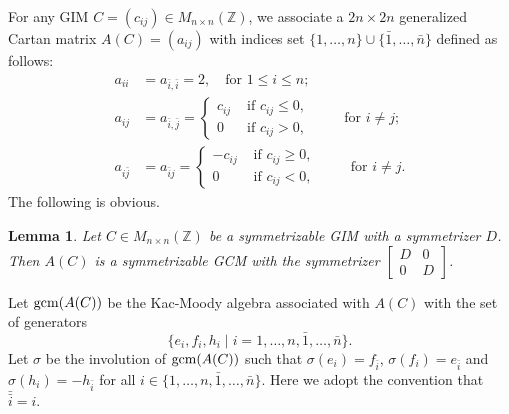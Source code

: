 \documentclass[12pt,reqno]{amsart}
\numberwithin{equation}{section}
\newtheorem{lemma}[theorem]{Lemma}
\begin{document}
	For any GIM ${C}=(c_{ij})\in M_{n\times n}(\mathbb{Z})$, we associate a $2n\times 2n$ generalized Cartan matrix $A(C)=(a_{ij})$ with indices set $\{1, \ldots, n\} \cup \{\bar{1}, \ldots, \bar{n}\}$ defined as follows:
	\begin{align}
		a_{ii}&=a_{\bar{i},\bar{i}}=2, \quad \text{for $1\leq i\leq n$}; \label{construction-GIM-GCM1}\\
		a_{ij}&=a_{\bar i,\bar j}=\begin{cases}
			c_{ij} & \text{ if } c_{ij}\le 0,\\
			0 & \text{ if } c_{ij}>0,
		\end{cases}
		\qquad \text{ for $i\neq j$};\label{construction-GIM-GCM2}\\
		a_{i\bar j}&=a_{\bar i j}=\begin{cases}
			-c_{ij} & \text{ if } c_{ij}\ge 0, \\
			0 &\text{ if }c_{ij}<0,
		\end{cases} \qquad\text{ for $i\neq j$}.\label{construction-GIM-GCM3}
	\end{align}
	The following is obvious.
	\begin{lemma}
		Let $C\in M_{n\times n}(\mathbb{Z})$ be a symmetrizable GIM with a symmetrizer $D$. Then $A(C)$ is a symmetrizable GCM with the symmetrizer $\begin{bmatrix}D&0\\ 0&D\end{bmatrix}$.
	\end{lemma}
	Let ${\rm gcm}(A(C))$ be the Kac-Moody algebra associated with $A(C)$ with the set of generators \[\{e_i,f_i,h_i\mid i=1, \ldots, n ,\bar{1}, \ldots, \bar{n}\}.\] 
	Let $\sigma$ be the involution of ${\rm gcm}(A(C))$ such that $\sigma(e_i)=f_{\bar{i}}$, $\sigma(f_i)=e_{\bar{i}}$ and $\sigma(h_{i})=-h_{\bar{i}}$ for all $i\in \{1,\ldots, n,\bar{1},\ldots, \bar{n}\}$. Here we adopt the convention that $\bar{\bar{i}}=i$.
	
\end{document}
